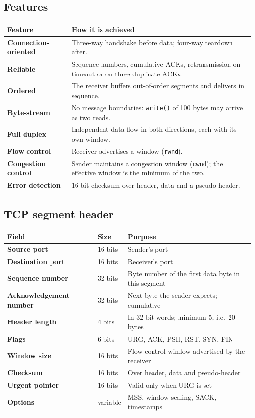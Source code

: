 \documentclass[11pt,a4paper]{article}
\begin{document}
\subsection{Features}

\begin{center}\small
\begin{tabularx}{\textwidth}{>{\bfseries}p{} X}
\toprule Feature & How it is achieved\\
\midrule
Connection-oriented & Three-way handshake before data; four-way teardown after.\\
Reliable & Sequence numbers, cumulative ACKs, retransmission on timeout or on three duplicate ACKs.\\
Ordered & The receiver buffers out-of-order segments and delivers in sequence.\\
Byte-stream & No message boundaries: \texttt{write()} of 100 bytes may arrive as two reads.\\
Full duplex & Independent data flow in both directions, each with its own window.\\
Flow control & Receiver advertises a window (\texttt{rwnd}).\\
Congestion control & Sender maintains a congestion window (\texttt{cwnd}); the effective window is the minimum of the two.\\
Error detection & 16-bit checksum over header, data and a pseudo-header.\\
\bottomrule
\end{tabularx}
\end{center}

\subsection{TCP segment header}

\begin{center}\small
\begin{tabularx}{\textwidth}{>{\bfseries}p{} p{} X}
\toprule Field & Size & Purpose\\
\midrule
Source port & 16 bits & Sender's port\\
Destination port & 16 bits & Receiver's port\\
Sequence number & 32 bits & Byte number of the first data byte in this segment\\
Acknowledgement number & 32 bits & Next byte the sender expects; cumulative\\
Header length & 4 bits & In 32-bit words; minimum 5, i.e.\ 20 bytes\\
Flags & 6 bits & URG, ACK, PSH, RST, SYN, FIN\\
Window size & 16 bits & Flow-control window advertised by the receiver\\
Checksum & 16 bits & Over header, data and pseudo-header\\
Urgent pointer & 16 bits & Valid only when URG is set\\
Options & variable & MSS, window scaling, SACK, timestamps\\
\bottomrule
\end{tabularx}
\end{center}
\end{document}
